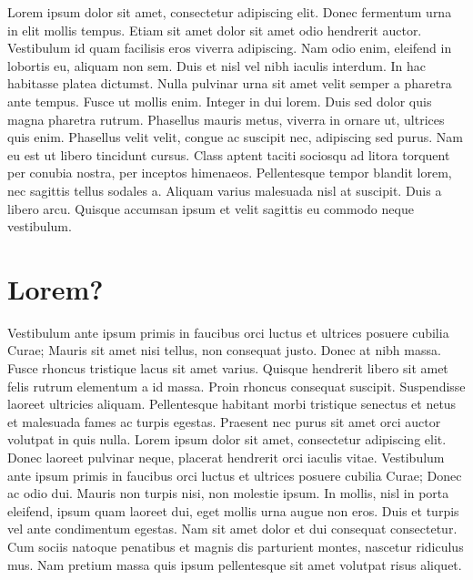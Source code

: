     \label{chapter:level-sets}

    Lorem ipsum dolor sit amet, consectetur adipiscing elit. Donec fermentum 
    urna in elit mollis tempus. Etiam sit amet dolor sit amet odio hendrerit 
    auctor. Vestibulum id quam facilisis eros viverra adipiscing. Nam odio 
    enim, eleifend in lobortis eu, aliquam non sem. Duis et nisl vel nibh 
    iaculis interdum. In hac habitasse platea dictumst. Nulla pulvinar urna 
    sit amet velit semper a pharetra ante tempus. Fusce ut mollis enim. Integer 
    in dui lorem. Duis sed dolor quis magna pharetra rutrum. Phasellus mauris 
    metus, viverra in ornare ut, ultrices quis enim. Phasellus velit velit, 
    congue ac suscipit nec, adipiscing sed purus. Nam eu est ut libero tincidunt 
    cursus. Class aptent taciti sociosqu ad litora torquent per conubia nostra, 
    per inceptos himenaeos. Pellentesque tempor blandit lorem, nec sagittis 
    tellus sodales a. Aliquam varius malesuada nisl at suscipit. Duis a libero 
    arcu. Quisque accumsan ipsum et velit sagittis eu commodo neque vestibulum.

\section{Lorem?}

    Vestibulum ante ipsum primis in faucibus orci luctus et ultrices posuere 
    cubilia Curae; Mauris sit amet nisi tellus, non consequat justo. Donec at 
    nibh massa. Fusce rhoncus tristique lacus sit amet varius. Quisque hendrerit 
    libero sit amet felis rutrum elementum a id massa. Proin rhoncus consequat 
    suscipit. Suspendisse laoreet ultricies aliquam. Pellentesque habitant morbi 
    tristique senectus et netus et malesuada fames ac turpis egestas. Praesent 
    nec purus sit amet orci auctor volutpat in quis nulla. Lorem ipsum dolor sit 
    amet, consectetur adipiscing elit. Donec laoreet pulvinar neque, placerat 
    hendrerit orci iaculis vitae. Vestibulum ante ipsum primis in faucibus orci 
    luctus et ultrices posuere cubilia Curae; Donec ac odio dui. Mauris non turpis 
    nisi, non molestie ipsum. In mollis, nisl in porta eleifend, ipsum quam 
    laoreet dui, eget mollis urna augue non eros. Duis et turpis vel ante 
    condimentum egestas. Nam sit amet dolor et dui consequat consectetur. Cum 
    sociis natoque penatibus et magnis dis parturient montes, nascetur ridiculus 
    mus. Nam pretium massa quis ipsum pellentesque sit amet volutpat risus aliquet.

